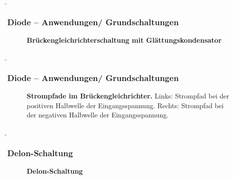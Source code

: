 \begin{frame}
    \b{ \frametitle{Diode -- Anwendungen/ Grundschaltungen}
        \begin{figure}[H]
            \centering
            
            \caption{\textbf{Brückengleichrichterschaltung mit Glättungskondensator}} 
        \end{figure}
    }   
\end{frame}

\begin{frame}
    \b{ \frametitle{Diode -- Anwendungen/ Grundschaltungen}
        \begin{figure}[H]
            \begin{minipage}[c]{0.48\textwidth}
                \raggedright
                
            \end{minipage}
            \begin{minipage}[c]{0.48\textwidth}
                \raggedleft
                
            \end{minipage}
        
            \caption{\textbf{Strompfade im Brückengleichrichter.} Links: Strompfad bei der positiven Halbwelle der 
            Eingangsspannung. Rechts: Strompfad bei der negativen Halbwelle der Eingangsspannung.} 
        \end{figure}
    }   
\end{frame}

\begin{frame}
    \b{ \frametitle{Delon-Schaltung}
    \begin{figure}[H]
        \centering
        \scalebox{0.8}{}
        \caption{\textbf{Delon-Schaltung} }
        \label{fig:DelonschaltungFolie}
    \end{figure}
    \begin{itemize}
    \end{itemize}
    }
\end{frame}

